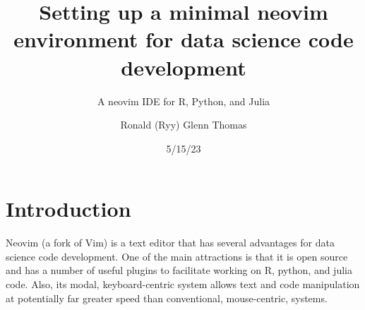 \documentclass[
  letterpaper,
  DIV=11,
  numbers=noendperiod,
  oneside]{scrartcl}
\title{Setting up a minimal neovim environment for data science code
development}
\subtitle{A neovim IDE for R, Python, and Julia}
\author{Ronald (Ryy) Glenn Thomas}
\date{5/15/23}
\renewcommand*\contentsname{Table of contents}
\newcommand\contentsname{Table of contents}
\begin{document}
\maketitle
\ifdefined\Shaded\renewenvironment{Shaded}{\begin{tcolorbox}[enhanced, interior hidden, borderline west={3pt}{0pt}{shadecolor}, boxrule=0pt, frame hidden, breakable, sharp corners]}{\end{tcolorbox}}\fi

\renewcommand*\contentsname{Table of contents}
{
\hypersetup{linkcolor=}
\setcounter{tocdepth}{3}
\tableofcontents
}

\hypertarget{introduction}{%
\section{Introduction}\label{introduction}}

Neovim (a fork of Vim) is a text editor that has several advantages for
data science code development. One of the main attractions is that it is
open source and has a number of useful plugins to facilitate working on
R, python, and julia code. Also, its modal, keyboard-centric system
allows text and code manipulation at potentially far greater speed than
conventional, mouse-centric, systems.
\end{document}
